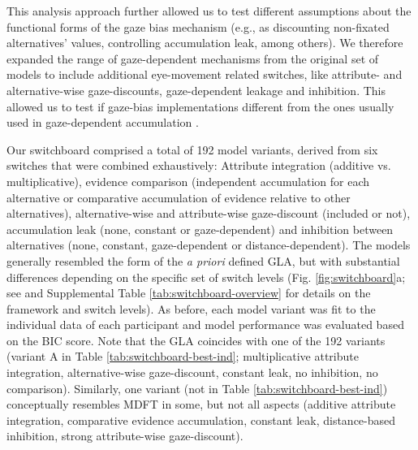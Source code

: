 \documentclass[11pt, a4paper]{article}
\begin{document}
This analysis approach further allowed us to test different assumptions about the functional forms of the gaze bias mechanism (e.g., as discounting non-ﬁxated alternatives’ values, controlling accumulation leak, among others\autocite{ashby2016FindingRightFit}). We therefore expanded the range of gaze-dependent mechanisms from the original set of models to include additional eye-movement related switches, like attribute- and alternative-wise gaze-discounts, gaze-dependent leakage and inhibition. This allowed us to test if gaze-bias implementations different from the ones usually used in gaze-dependent accumulation \autocite{fisher2017AttentionalDriftDiffusion,krajbich2010VisualFixationsComputation,krajbich2011MultialternativeDriftdiffusionModel,krajbich2012AttentionalDriftdiffusionModel,molter2019GLAMboxPythonToolbox,thomas2019GazeBiasDifferences,smith2018AttentionChoiceDomains,tavares2017AttentionalDriftDiffusion}.

Our switchboard comprised a total of 192 model variants, derived from six switches that were combined exhaustively: Attribute integration (additive vs. multiplicative), evidence comparison (independent accumulation for each alternative or comparative accumulation of evidence relative to other alternatives), alternative-wise and attribute-wise gaze-discount (included or not), accumulation leak (none, constant or gaze-dependent) and inhibition between alternatives (none, constant, gaze-dependent or distance-dependent). The models generally resembled the form of the \emph{a priori} defined GLA, but with substantial differences depending on the specific set of switch levels (Fig. \ref{fig:switchboard}a; see  and Supplemental Table \ref{tab:switchboard-overview} for details on the framework and switch levels). As before, each model variant was fit to the individual data of each participant and model performance was evaluated based on the BIC score. Note that the GLA coincides with one of the 192 variants (variant A in Table \ref{tab:switchboard-best-ind}; multiplicative attribute integration, alternative-wise gaze-discount, constant leak, no inhibition, no comparison). Similarly, one variant (not in Table \ref{tab:switchboard-best-ind}) conceptually resembles MDFT in some, but not all aspects (additive attribute integration, comparative evidence accumulation, constant leak, distance-based inhibition, strong attribute-wise gaze-discount).
\end{document}
